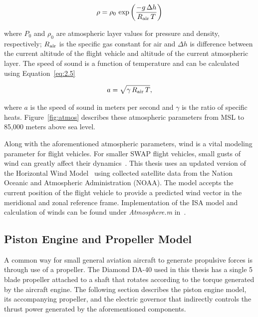 \documentclass[12pt]{report}
\begin{document}
\begin{equation}
  \rho = \rho_0\,\exp\left({\frac{-g\,\Delta h}{R\textsubscript{air}\,T}}\right)
  \label{eq:2.4}
\end{equation}

where \(P_0\) and \(\rho_0\) are atmospheric layer values for pressure and density, respectively; \(R\textsubscript{air}\) is the specific gas constant for air and \(\Delta h\) is difference between the current altitude of the flight vehicle and altitude of the current atmospheric layer. The speed of sound is a function of temperature and can be calculated using Equation~\ref{eq:2.5}

\begin{equation}
  a = \sqrt{\gamma \, R\textsubscript{air}\,T},
  \label{eq:2.5}
\end{equation}

where \(a\) is the speed of sound in meters per second and \( \gamma \) is the ratio of specific heats. Figure~\ref{fig:atmos} describes these atmospheric parameters from MSL to 85,000 meters above sea level.

Along with the aforementioned atmospheric parameters, wind is a vital modeling parameter for flight vehicles. For smaller SWAP flight vehicles, small gusts of wind can greatly affect their dynamics~\cite{raymerAircraftDesignConceptual2018}. This thesis uses an updated version of the Horizontal Wind Model~\cite{drobEmpiricalModelEarth2008,drobUpdateHorizontalWind2015} using collected satellite data from the Nation Oceanic and Atmospheric Administration (NOAA). The model accepts the current position of the flight vehicle to provide a predicted wind vector in the meridional and zonal reference frame. Implementation of the ISA model and calculation of winds can be found under \textit{Atmosphere.m} in~\cite{millerNsm0014thesis1969}.

\subsection{Piston Engine and Propeller Model}
A common way for small general aviation aircraft to generate propulsive forces is through use of a propeller. The Diamond DA-40 used in this thesis has a single 5 blade propeller attached to a shaft that rotates according to the torque generated by the aircraft engine. The following section describes the piston engine model, its accompanying propeller, and the electric governor that indirectly controls the thrust power generated by the aforementioned components.
\end{document}
